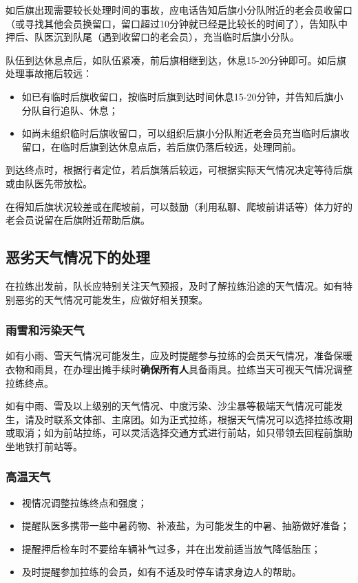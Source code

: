 \documentclass[UTF8]{ctexart}
\begin{document}
如后旗出现需要较长处理时间的事故，应电话告知后旗小分队附近的老会员收留口（或寻找其他会员换留口，留口超过10分钟就已经是比较长的时间了），告知队中押后、队医沉到队尾（遇到收留口的老会员），充当临时后旗小分队。

队伍到达休息点后，如队伍紧凑，前后旗相继到达，休息15-20分钟即可。如后旗处理事故拖后较远：
\begin{itemize}[nosep,left=2em]
    \item 如已有临时后旗收留口，按临时后旗到达时间休息15-20分钟，并告知后旗小分队自行追队、休息；
    \item 如尚未组织临时后旗收留口，可以组织后旗小分队附近老会员充当临时后旗收留口，在临时后旗到达休息点后，若后旗仍落后较远，处理同前。
\end{itemize}

到达终点时，根据行者定位，若后旗落后较远，可根据实际天气情况决定等待后旗或由队医先带放松。

在得知后旗状况较差或在爬坡前，可以鼓励（利用私聊、爬坡前讲话等）体力好的老会员说留在后旗附近帮助后旗。

\subsection{恶劣天气情况下的处理}

在拉练出发前，队长应特别关注天气预报，及时了解拉练沿途的天气情况。如有特别恶劣的天气情况可能发生，应做好相关预案。

\subsubsection{雨雪和污染天气}

如有小雨、雪天气情况可能发生，应及时提醒参与拉练的会员天气情况，准备保暖衣物和雨具，在办理出摊手续时\textbf{确保所有人}具备雨具。拉练当天可视天气情况调整拉练终点。

如有中雨、雪及以上级别的天气情况、中度污染、沙尘暴等极端天气情况可能发生，请及时联系文体部、主席团。如为正式拉练，根据天气情况可以选择拉练改期或取消；如为前站拉练，可以灵活选择交通方式进行前站，如只带领去回程前旗助坐地铁打前站等。

\subsubsection{高温天气}

\begin{itemize}[nosep,left=2em]
    \item 视情况调整拉练终点和强度；
    \item 提醒队医多携带一些中暑药物、补液盐，为可能发生的中暑、抽筋做好准备；
    \item 提醒押后检车时不要给车辆补气过多，并在出发前适当放气降低胎压；
    \item 及时提醒参加拉练的会员，如有不适及时停车请求身边人的帮助。
\end{itemize}
\end{document}
